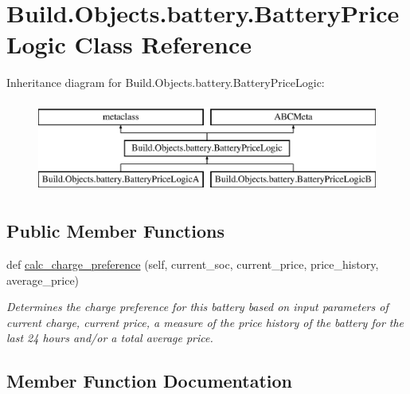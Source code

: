 \hypertarget{class_build_1_1_objects_1_1battery_1_1_battery_price_logic}{}\section{Build.\+Objects.\+battery.\+Battery\+Price\+Logic Class Reference}
\label{class_build_1_1_objects_1_1battery_1_1_battery_price_logic}
Inheritance diagram for Build.\+Objects.\+battery.\+Battery\+Price\+Logic\+:\begin{figure}[H]
\begin{center}
\leavevmode
\includegraphics[height=3.000000cm]{class_build_1_1_objects_1_1battery_1_1_battery_price_logic}
\end{center}
\end{figure}
\subsection*{Public Member Functions}
\begin{DoxyCompactItemize}
\item 
def \hyperlink{class_build_1_1_objects_1_1battery_1_1_battery_price_logic_a1a8b8b9981e6bd1cc42d65968cb07c33}{calc\+\_\+charge\+\_\+preference} (self, current\+\_\+soc, current\+\_\+price, price\+\_\+history, average\+\_\+price)
\begin{DoxyCompactList}\small\item\em Determines the charge preference for this battery based on input parameters of current charge, current price, a measure of the price history of the battery for the last 24 hours and/or a total average price. \end{DoxyCompactList}\end{DoxyCompactItemize}


\subsection{Member Function Documentation}
\mbox{\label{class_build_1_1_objects_1_1battery_1_1_battery_price_logic_a1a8b8b9981e6bd1cc42d65968cb07c33}} 
